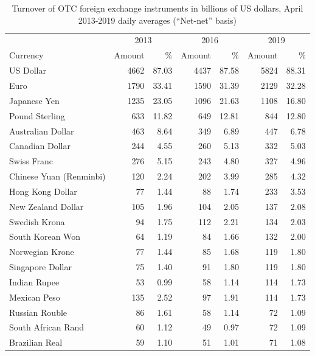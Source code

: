 \documentclass[a4paper, twoside]{templates/ociamthesis}
\begin{document}
\begin{table}[H]

\caption{\label{tab:TableAA21}Turnover of OTC foreign exchange instruments in billions of US dollars, April 2013-2019 daily averages (``Net-net'' basis)}
\centering
\fontsize{10}{12}\selectfont
\begin{threeparttable}
\begin{tabular}[t]{lrrrrrr}
\toprule
\multicolumn{1}{c}{ } & \multicolumn{2}{c}{2013} & \multicolumn{2}{c}{2016} & \multicolumn{2}{c}{2019} \\
\cmidrule(l{3pt}r{3pt}){2-3} \cmidrule(l{3pt}r{3pt}){4-5} \cmidrule(l{3pt}r{3pt}){6-7}
Currency & Amount & $\%$ & Amount & $\%$ & Amount & $\%$\\
\midrule
US Dollar & 4662 & 87.03 & 4437 & 87.58 & 5824 & 88.31\\
Euro & 1790 & 33.41 & 1590 & 31.39 & 2129 & 32.28\\
Japanese Yen & 1235 & 23.05 & 1096 & 21.63 & 1108 & 16.80\\
Pound Sterling & 633 & 11.82 & 649 & 12.81 & 844 & 12.80\\
Australian Dollar & 463 & 8.64 & 349 & 6.89 & 447 & 6.78\\
Canadian Dollar & 244 & 4.55 & 260 & 5.13 & 332 & 5.03\\
Swiss Franc & 276 & 5.15 & 243 & 4.80 & 327 & 4.96\\
Chinese Yuan (Renminbi) & 120 & 2.24 & 202 & 3.99 & 285 & 4.32\\
Hong Kong Dollar & 77 & 1.44 & 88 & 1.74 & 233 & 3.53\\
New Zealand Dollar & 105 & 1.96 & 104 & 2.05 & 137 & 2.08\\
Swedish Krona & 94 & 1.75 & 112 & 2.21 & 134 & 2.03\\
South Korean Won & 64 & 1.19 & 84 & 1.66 & 132 & 2.00\\
Norwegian Krone & 77 & 1.44 & 85 & 1.68 & 119 & 1.80\\
Singapore Dollar & 75 & 1.40 & 91 & 1.80 & 119 & 1.80\\
Indian Rupee & 53 & 0.99 & 58 & 1.14 & 114 & 1.73\\
Mexican Peso & 135 & 2.52 & 97 & 1.91 & 114 & 1.73\\
Russian Rouble & 86 & 1.61 & 58 & 1.14 & 72 & 1.09\\
South African Rand & 60 & 1.12 & 49 & 0.97 & 72 & 1.09\\
Brazilian Real & 59 & 1.10 & 51 & 1.01 & 71 & 1.08\\

\end{tabular}
\end{threeparttable}
\end{table}
\end{document}

